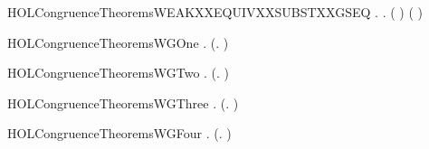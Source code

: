 \newcommand{\HOLCongruenceTheoremsWEAKXXEQUIVXXSUBSTXXGCONTEXT}{\UseVerbatim{HOLCongruenceTheoremsWEAKXXEQUIVXXSUBSTXXGCONTEXT}}
\begin{SaveVerbatim}{HOLCongruenceTheoremsWEAKXXEQUIVXXSUBSTXXGSEQ}
\HOLTokenTurnstile{} \HOLSymConst{\HOLTokenForall{}} .    \HOLSymConst{\HOLTokenImp{}} \HOLSymConst{\HOLTokenForall{}}.   \HOLSymConst{\HOLTokenImp{}}  ( ) ( )
\end{SaveVerbatim}
\newcommand{\HOLCongruenceTheoremsWEAKXXEQUIVXXSUBSTXXGSEQ}{\UseVerbatim{HOLCongruenceTheoremsWEAKXXEQUIVXXSUBSTXXGSEQ}}
\begin{SaveVerbatim}{HOLCongruenceTheoremsWGOne}
\HOLTokenTurnstile{} \HOLSymConst{\HOLTokenForall{}}.  (\HOLTokenLambda{}. )
\end{SaveVerbatim}
\newcommand{\HOLCongruenceTheoremsWGOne}{\UseVerbatim{HOLCongruenceTheoremsWGOne}}
\begin{SaveVerbatim}{HOLCongruenceTheoremsWGTwo}
\HOLTokenTurnstile{} \HOLSymConst{\HOLTokenForall{}}.  (\HOLTokenLambda{}. )
\end{SaveVerbatim}
\newcommand{\HOLCongruenceTheoremsWGTwo}{\UseVerbatim{HOLCongruenceTheoremsWGTwo}}
\begin{SaveVerbatim}{HOLCongruenceTheoremsWGThree}
\HOLTokenTurnstile{} \HOLSymConst{\HOLTokenForall{}} .   \HOLSymConst{\HOLTokenImp{}}  (\HOLTokenLambda{}.  )
\end{SaveVerbatim}
\newcommand{\HOLCongruenceTheoremsWGThree}{\UseVerbatim{HOLCongruenceTheoremsWGThree}}
\begin{SaveVerbatim}{HOLCongruenceTheoremsWGFour}
\HOLTokenTurnstile{} \HOLSymConst{\HOLTokenForall{}} .   \HOLSymConst{\HOLTokenConj{}}   \HOLSymConst{\HOLTokenImp{}}  (\HOLTokenLambda{}.   \HOLSymConst{\ensuremath{+}}  )
\end{SaveVerbatim}
